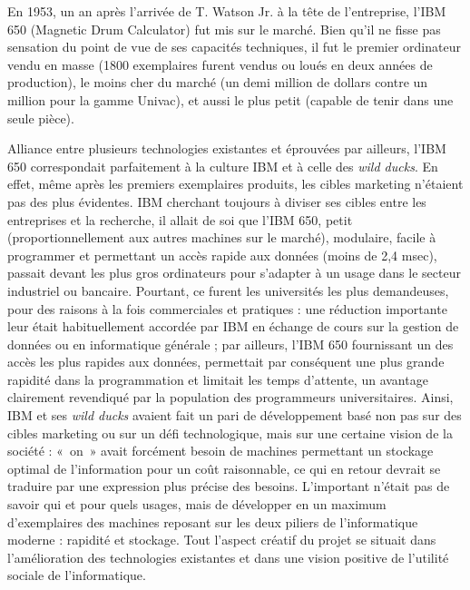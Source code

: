\documentclass{FramateX}
\begin{document}
\begin{refsection}
En 1953, un an après l'arrivée de T. Watson Jr. à la
tête de l'entreprise, l'IBM 650
(Magnetic Drum Calculator) fut mis sur le marché. Bien
qu'il ne fisse pas sensation du point de vue de ses
capacités techniques, il fut le premier ordinateur vendu en masse (1800
exemplaires furent vendus ou loués en deux années de production), le
moins cher du marché (un demi million de dollars contre un million pour
la gamme Univac), et aussi le plus petit (capable de tenir dans une
seule pièce).

Alliance entre plusieurs technologies existantes et éprouvées par
ailleurs, l'IBM 650 correspondait parfaitement à la
culture IBM et à celle des \textit{wild ducks}. En effet, même après
les premiers exemplaires produits, les cibles marketing
n'étaient pas des plus évidentes. IBM cherchant
toujours à diviser ses cibles entre les entreprises et la recherche, il
allait de soi que l'IBM 650, petit
(proportionnellement aux autres machines sur le marché), modulaire,
facile à programmer et permettant un accès rapide aux données (moins de
2,4 msec), passait devant les plus gros ordinateurs pour
s'adapter à un usage dans le secteur industriel ou
bancaire. Pourtant, ce furent les universités les plus demandeuses,
pour des raisons à la fois commerciales et pratiques : une réduction
importante leur était habituellement accordée par IBM en échange de
cours sur la gestion de données ou en informatique générale ; par
ailleurs, l'IBM 650 fournissant un des accès les plus
rapides aux données, permettait par conséquent une plus grande rapidité
dans la programmation et limitait les temps d'attente,
un avantage clairement revendiqué par la population des programmeurs
universitaires. Ainsi, IBM et ses \textit{wild ducks} avaient fait un
pari de développement basé non pas sur des cibles marketing ou sur un
défi technologique, mais sur une certaine vision de la société : «~on~»
avait forcément besoin de machines permettant un stockage optimal de
l'information pour un coût raisonnable, ce qui en
retour devrait se traduire par une expression plus précise des besoins.
L'important n'était pas de savoir qui
et pour quels usages, mais de développer en un maximum
d'exemplaires des machines reposant sur les deux
piliers de l'informatique moderne : rapidité et
stockage. Tout l'aspect créatif du projet se situait
dans l'amélioration des technologies existantes et
dans une vision positive de l'utilité sociale de
l'informatique.


\end{refsection}
\end{document}
